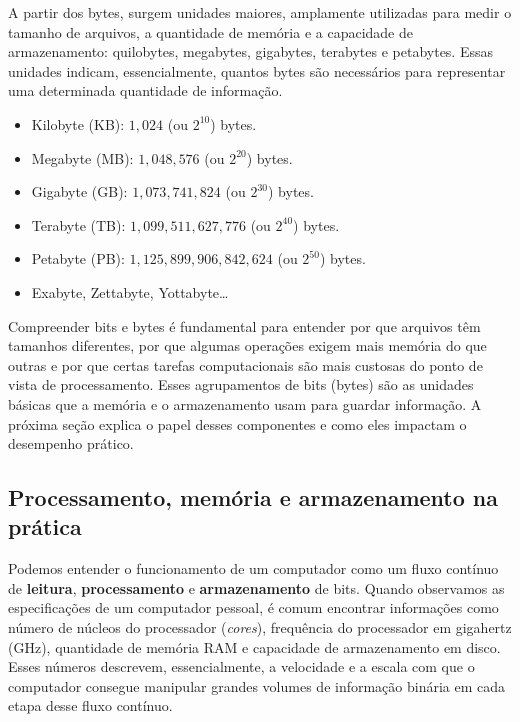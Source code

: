 \documentclass[
  brazilian,
  letterpaper,
  DIV=11,
  numbers=noendperiod]{scrreprt}
\providecommand{\tightlist}{%
  \setlength{\itemsep}{0pt}\setlength{\parskip}{0pt}}
\begin{document}
A partir dos bytes, surgem unidades maiores, amplamente utilizadas para
medir o tamanho de arquivos, a quantidade de memória e a capacidade de
armazenamento: quilobytes, megabytes, gigabytes, terabytes e petabytes.
Essas unidades indicam, essencialmente, quantos bytes são necessários
para representar uma determinada quantidade de informação.

\begin{itemize}
\tightlist
\item
  Kilobyte (KB): \(1{,}024\) (ou \(2^{10}\)) bytes.
\item
  Megabyte (MB): \(1{,}048{,}576\) (ou \(2^{20}\)) bytes.
\item
  Gigabyte (GB): \(1{,}073{,}741{,}824\) (ou \(2^{30}\)) bytes.
\item
  Terabyte (TB): \(1{,}099{,}511{,}627{,}776\) (ou \(2^{40}\)) bytes.
\item
  Petabyte (PB): \(1{,}125{,}899{,}906{,}842{,}624\) (ou \(2^{50}\))
  bytes.
\item
  Exabyte, Zettabyte, Yottabyte\ldots{}
\end{itemize}

Compreender bits e bytes é fundamental para entender por que arquivos
têm tamanhos diferentes, por que algumas operações exigem mais memória
do que outras e por que certas tarefas computacionais são mais custosas
do ponto de vista de processamento. Esses agrupamentos de bits (bytes)
são as unidades básicas que a memória e o armazenamento usam para
guardar informação. A próxima seção explica o papel desses componentes e
como eles impactam o desempenho prático.

\subsection{Processamento, memória e armazenamento na
prática}\label{processamento-memuxf3ria-e-armazenamento-na-pruxe1tica}

Podemos entender o funcionamento de um computador como um fluxo contínuo
de \textbf{leitura}, \textbf{processamento} e \textbf{armazenamento} de
bits. Quando observamos as especificações de um computador pessoal, é
comum encontrar informações como número de núcleos do processador
(\emph{cores}), frequência do processador em gigahertz (GHz), quantidade
de memória RAM e capacidade de armazenamento em disco. Esses números
descrevem, essencialmente, a velocidade e a escala com que o computador
consegue manipular grandes volumes de informação binária em cada etapa
desse fluxo contínuo.
\end{document}
